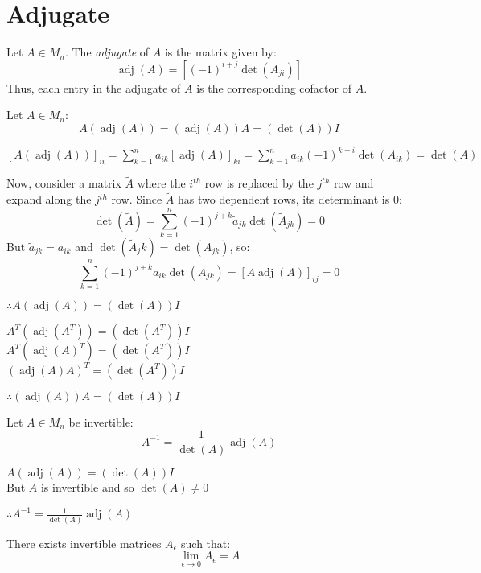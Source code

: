 \documentclass[letterpaper,12pt,fleqn]{article}
\DeclareMathOperator{\adj}{adj}
\newcommand{\At}{\tilde{A}}
\newcommand{\at}{\tilde{a}}
\newcommand{\e}{\epsilon}
\begin{document}
\section*{Adjugate}

\begin{definition}
  Let $A\in M_n$. The \emph{adjugate} of $A$ is the matrix given by:
  \[\adj(A)=[(-1)^{i+j}\det(A_{ji})]\]
  Thus, each entry in the adjugate of $A$ is the corresponding cofactor of $A$.
\end{definition}

\begin{lemma}
  Let $A\in M_n$:
  \[A(\adj(A))=(\adj(A))A=(\det(A))I\]
\end{lemma}

\begin{theproof}
  $[A(\adj(A))]_{ii}=\sum_{k=1}^na_{ik}[\adj(A)]_{ki}=
  \sum_{k=1}^na_{ik}(-1)^{k+i}\det(A_{ik})=\det(A)$

  Now, consider a matrix $\At$ where the $i^{th}$ row is replaced by the $j^{th}$ row
  and expand along the $j^{th}$ row. Since $\At$ has two dependent rows, its determinant
  is 0:
  \[\det(\At)=\sum_{k=1}^n(-1)^{j+k}\at_{jk}\det(\At_{jk})=0\]
  But $\at_{jk}=a_{ik}$ and $\det(\At_jk)=\det(A_{jk})$, so:
  \[\sum_{k=1}^n(-1)^{j+k}a_{ik}\det(A_{jk})=[A\adj(A)]_{ij}=0\]

  $\therefore A(\adj(A))=(\det(A))I$

  $A^T(\adj(A^T))=(\det(A^T))I$ \\
  $A^T(\adj(A)^T)=(\det(A^T))I$ \\
  $(\adj(A)A)^T=(\det(A^T))I$

  $\therefore (\adj(A))A=(\det(A))I$
\end{theproof}

\begin{corollary}
  Let $A\in M_n$ be invertible:
  \[A^{-1}=\frac{1}{\det(A)}\adj(A)\]
\end{corollary}

\begin{theproof}
  $A(\adj(A))=(\det(A))I$ \\
  But $A$ is invertible and so $\det(A)\ne0$

  $\therefore A^{-1}=\frac{1}{\det(A)}\adj(A)$
\end{theproof}

\begin{lemma}
  There exists invertible matrices $A_{\e}$ such that:
  \[\lim_{\e\to0}A_{\e}=A\]
\end{lemma}
\end{document}
